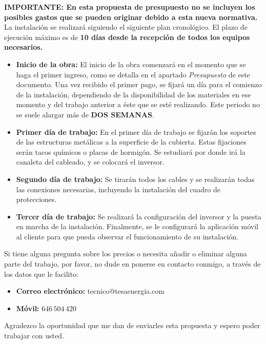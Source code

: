 \begin{spacing}{1.2}
\textbf{IMPORTANTE: En esta propuesta de presupuesto no se incluyen los posibles gastos que se pueden originar debido a esta nueva normativa.}
La instalación se realizará siguiendo el siguiente plan cronológico. El plazo de ejecución máximo es de \textbf{10 días desde la recepción de todos los equipos necesarios.}

\begin{itemize}\itemsep1pt \parskip0pt 
\item \textbf{Inicio de la obra:} El inicio de la obra comenzará en el momento que se haga el primer ingreso, como se detalla en el apartado \textit{Presupuesto} de este documento. Una vez recibido el primer pago, se fijará un día para el comienzo de la instalación, dependiendo de la disponibilidad de los materiales en ese momento y del trabajo anterior a éste que se esté realizando. Este periodo no se suele alargar más de \textbf{DOS SEMANAS}. 
\item \textbf{Primer día de trabajo:} En el primer día de trabajo se fijarán los soportes de las estructuras metálicas a la superficie de la cubierta. Estas fijaciones serán tacos químicos o placas de hormigón. Se estudiará por donde irá la canaleta del cableado, y se colocará el inversor.
\item \textbf{Segundo día de trabajo:} Se tirarán todos los cables y se realizarán todas las conexiones necesarias, incluyendo la instalación del cuadro de protecciones.
\item \textbf{Tercer día de trabajo:} Se realizará la configuración del inversor y la puesta en marcha de la instalación. Finalmente, se le configurará la aplicación móvil al cliente para que pueda observar el funcionamiento de su instalación.
\end{itemize}

Si tiene alguna pregunta sobre los precios o necesita añadir o eliminar alguna parte del trabajo, por favor, no dude en ponerse en contacto conmigo, a través de los datos que le facilito:

\begin{itemize}
\item \textbf{Correo electrónico:} tecnico@tesaenergia.com
\item \textbf{Móvil:} $646\,504\,420$ 
\end{itemize}

Agradezco la oportunidad que me dan de enviarles esta propuesta y espero poder trabajar con usted.

\end{spacing}
\endinput
